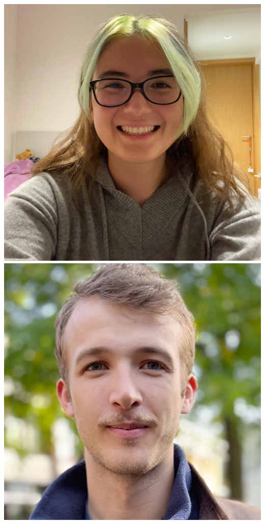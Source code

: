 \documentclass[aspectratio=169]{beamer}
\begin{document}
\begin{frame}
{        \includegraphics[width=0.06\textheight]{people/sinah_legner.jpg}%
        \includegraphics[width=0.06\textheight]{people/toby_lovick.jpg}%
}
\end{frame}
\end{document}
